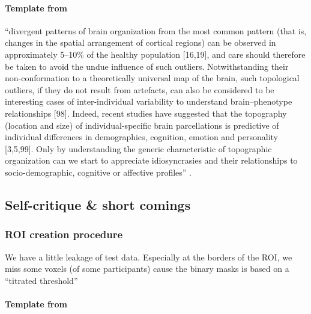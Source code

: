 \paragraph{Template from \citet{eickhoff2018imaging}}
%
``divergent patterns of brain organization from the most common pattern (that
is, changes in the spatial arrangement of cortical regions) can be observed in
approximately 5–10\% of the healthy population [16,19], and care should
therefore be taken to avoid the undue influence of such outliers.
%
Notwithstanding their non-conformation to a theoretically universal map of the
brain, such topological outliers, if they do not result from artefacts, can also
be considered to be interesting cases of inter-individual variability to
understand brain–phenotype relationships [98].
%
Indeed, recent studies have suggested that the topography (location and size) of
individual-specific brain parcellations is predictive of individual differences
in demographics, cognition, emotion and personality [3,5,99].
%
Only by understanding the generic characteristic of topographic organization can
we start to appreciate idiosyncrasies and their relationships to
socio-demographic, cognitive or affective profiles''
\citep{eickhoff2018imaging}.


\subsection{Self-critique \& short comings}


\subsubsection{ROI creation procedure}


%
We have a little leakage of test data.
%
Especially at the borders of the ROI, we miss some voxels (of some participants)
cause the binary masks is based on a ``titrated threshold''
\citep{sengupta2016extension}

%
\paragraph{Template from \citet{weiner2018defining}}

